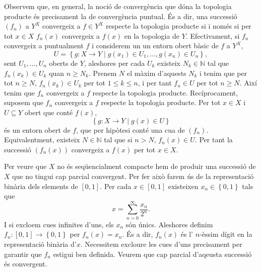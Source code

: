 \documentclass[12pt]{article}
\numberwithin{table}{section}
\numberwithin{figure}{section}
\numberwithin{equation}{section}
\newcommand{\N}{\mathbb{N}}
\newcommand{\set}[1]{\left\{ #1\right\}}
\begin{document}
Observem que, en general, la noció de convergència que dóna la topologia producte és precisament la de convergència puntual. És a dir, una successió \( (f_n) \) a \( Y^X \) convergeix a \( f \in Y^X \) respecte la topologia producte si i només si per tot \( x \in X \) \( f_n(x) \) convergeix a \( f(x) \) en la topologia de \( Y \). Efectivament, si \( f_n \) convergeix a puntualment \( f \) i considerem un un entorn obert bàsic de \( f \) a \( Y^X \),
\begin{equation*}
	U = \set{g \colon X \to Y \mid g(x_1) \in U_1, \dots, g(x_n) \in U_n},
\end{equation*}
sent \( U_1, \dots, U_n \) oberts de \( Y \), aleshores per cada \( U_k \) existeix \( N_k \in \N \) tal que \( f_n(x_k) \in U_k \) quan \( n \geq N_k \). Prenem \( N \) el màxim d'aquests \( N_k \) i tenim que per tot \( n \geq N \), \( f_n(x_k) \in U_k \) per tot \( 1 \leq k \leq n \), i per tant \( f_n \in U \) per tot \( n \geq N \). Així tenim que \( f_n \) convergeix a \( f \) respecte la topologia producte. Recíprocament, suposem que \( f_n \) convergeix a \( f \) respecte la topologia producte. Per tot \( x \in X \) i \( U \subseteq Y \) obert que conté \( f(x) \),
\begin{equation*}
	\set{g \colon X \to Y \mid g(x) \in U}
\end{equation*}
és un entorn obert de \( f \), que per hipòtesi conté una cua de \( (f_n) \). Equivalentment, existeix \( N \in \N \) tal que si \( n > N \), \( f_n(x) \in U \). Per tant la successió \( (f_n(x)) \) convergeix a \( f(x) \) per tot \( x \in X \).  

Per veure que \( X \) no és seqüencialment compacte hem de produir una successió de \( X \) que no tingui cap parcial convergent. Per fer això farem ús de la representació binària dels elements de \( [0,1] \). Per cada \( x \in [0,1] \) existeixen \( x_n \in \set{0,1} \) tals que
\begin{equation*}
x = \sum_{n = 0}^{\infty} \frac{x_n}{2^n}.
\end{equation*}
I si excloem cues infinites d'uns, els \( x_n \) són únics. Aleshores definim \( f_n \colon [0,1] \to \set{0,1} \) per \( f_n(x) = x_n \). És a dir, \( f_n(x) \) és l' \( n \)-èssim dígit en la representació binària d'\( x \). Necessitem excloure les cues d'uns precisament per garantir que \( f_n \) estigui ben definida. Veurem que cap parcial d'aqeusta successió és convergent.
\end{document}
